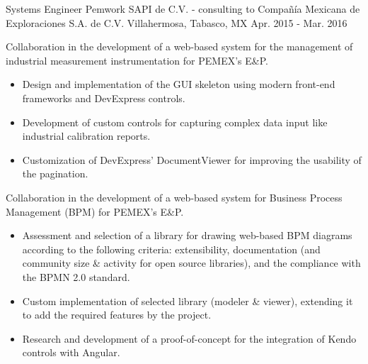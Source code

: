\begin{cventries}

\cventry
{Systems Engineer} %
{Pemwork SAPI de C.V. - consulting to Compañía Mexicana de Exploraciones S.A. de C.V.} %
{Villahermosa, Tabasco, MX} %
{Apr. 2015 - Mar. 2016} %
{ %
	\begin{cvitems}
		\item{Collaboration in the development of a web-based system for the management of industrial measurement instrumentation for PEMEX's E\&P.}
		\begin{itemize}
			\item{Design and implementation of the GUI skeleton using modern front-end frameworks and DevExpress controls.}
			\item{Development of custom controls for capturing complex data input like industrial calibration reports.}
			\item{Customization of DevExpress' DocumentViewer for improving the usability of the pagination.}
		\end{itemize}		
		\item{Collaboration in the development of a web-based system for Business Process Management (BPM) for PEMEX's E\&P.}
		\begin{itemize}
			\item{Assessment and selection of a library for drawing web-based BPM diagrams according to the following criteria: extensibility, documentation (and community size \& activity for open source libraries), and the compliance with the BPMN 2.0 standard.}
			\item{Custom implementation of selected library (modeler \& viewer), extending it to add the required features by the project.}
			\item{Research and development of a proof-of-concept for the integration of Kendo controls with Angular.}
		\end{itemize}
	\end{cvitems}
}



\end{cventries}

